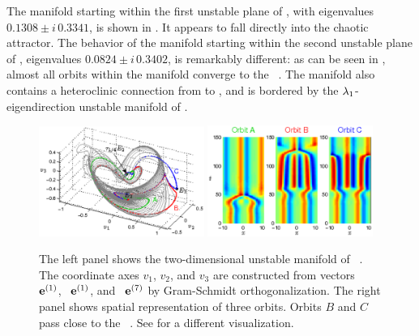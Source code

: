 The manifold starting within the first unstable plane of , with
eigenvalues $0.1308\pm i\,0.3341$, is shown in
. It appears to fall directly into the
chaotic attractor.  The behavior of the manifold starting within
the second unstable plane of , eigenvalues $0.0824\pm i \, 0.3402$, is
remarkably different: as can be seen in ,
almost all orbits within the manifold converge to the \eqv\ .  The
manifold also contains a heteroclinic connection from  to ,
and is bordered by the $\eigExp[1]$-eigendirection
unstable manifold of .

\begin{figure}[ht]
\begin{center}
\includegraphics[width=0.48\textwidth, clip=true]{figs_bmp/ks22_E2_manifold_c.eps}
\includegraphics[width=0.48\textwidth, clip=true]{figs_bmp/ks22_E2_orbits_c.eps}
\end{center}
\caption{
The left panel shows the two-dimensional
unstable manifold of \eqv\ . The coordinate axes
$v_1$, $v_2$, and $v_3$ are constructed from vectors
\Re\, $\jEigvec{1}$, \Im\, $\jEigvec{1}$, and \Re\, $\jEigvec{7}$
by Gram-Schmidt orthogonalization.
The right panel shows spatial representation of three orbits. Orbits
$B$ and $C$ pass close to the \eqv\ . See
 for a different visualization.
       }
\label{f:KS22E2man}
\end{figure}


